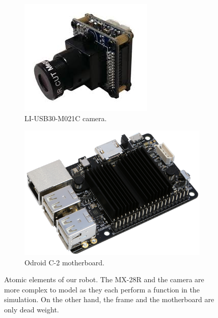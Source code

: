 \begin{figure}[htp]
    \begin{subfigure}[b]{0.4\textwidth}
    \center
    \includegraphics[width = \textwidth]{figures/li_cam}
    \caption{LI-USB30-M021C camera. \label{fig:li_cam}}
    \end{subfigure}
    \hfill
    \begin{subfigure}[b]{0.4\textwidth}
    \center
    \includegraphics[width = \textwidth]{figures/odroid-c2}
    \caption{Odroid C-2 motherboard. \label{fig:odroid}}
    \end{subfigure}
    \caption[Atomic elements of our robot]{Atomic elements of our robot. The MX-28R and the camera are more complex to model as they each perform a function in the simulation. On the other hand, the frame and the motherboard are only dead weight.}
    \label{fig:modelling_problem}
\end{figure}

